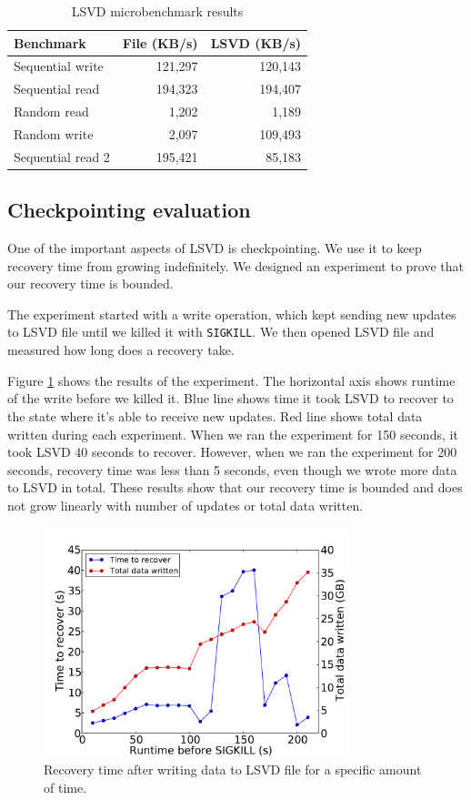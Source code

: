 \begin{table}
\centering
\caption{LSVD microbenchmark results}
\label{tab:lsvd}
\begin{tabular}{ | l | r | r | }
\hline
\textbf{Benchmark} & \textbf{File (KB/s)} & \textbf{LSVD (KB/s)} \\
\hline
Sequential write & 121,297 & 120,143 \\
\hline
Sequential read & 194,323 & 194,407 \\
\hline
Random read & 1,202 & 1,189 \\
\hline
Random write & 2,097 & 109,493 \\
\hline
Sequential read 2 & 195,421 & 85,183 \\
\hline
\end{tabular}
\end{table}

\subsection{Checkpointing evaluation}
One of the important aspects of LSVD is checkpointing. We use it to keep recovery time from growing indefinitely. We designed an experiment to prove that our recovery time is bounded.

The experiment started with a write operation, which kept sending new updates to LSVD file until we killed it with \texttt{SIGKILL}. We then opened LSVD file and measured how long does a recovery take.

Figure \ref{fig:checkpointing} shows the results of the experiment. The horizontal axis shows runtime of the write before we killed it. Blue line shows time it took LSVD to recover to the state where it's able to receive new updates. Red line shows total data written during each experiment. When we ran the experiment for 150 seconds, it took LSVD 40 seconds to recover. However, when we ran the experiment for 200 seconds, recovery time was less than 5 seconds, even though we wrote more data to LSVD in total. These results show that our recovery time is bounded and does not grow linearly with number of updates or total data written. 

\begin{figure}
  \centering
   \includegraphics[width=3.5in]{figures/checkpointing.pdf}
   \caption{Recovery time after writing data to LSVD file for a specific amount of time.}
   \label{fig:checkpointing}
\end{figure}

